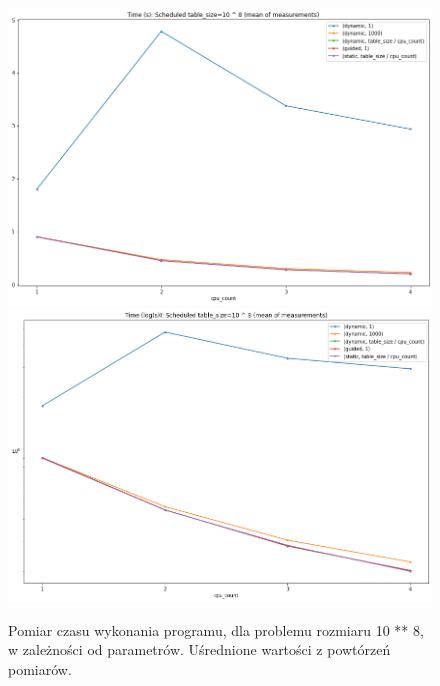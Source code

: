 \documentclass{article}
\begin{document}
        \begin{figure}[h!]
            \centering
            \includegraphics[width=17cm]{report2/images/TableSize/ex3_tb8_mean.png}
            \includegraphics[width=17cm]{report2/images/TableSize/ex3_tb8_mean_log.png}
            \caption{Pomiar czasu wykonania programu, dla problemu rozmiaru 10 ** 8, w zależności od parametrów. Uśrednione wartości z powtórzeń pomiarów. }
        \end{figure}
        \newpage
\end{document}
